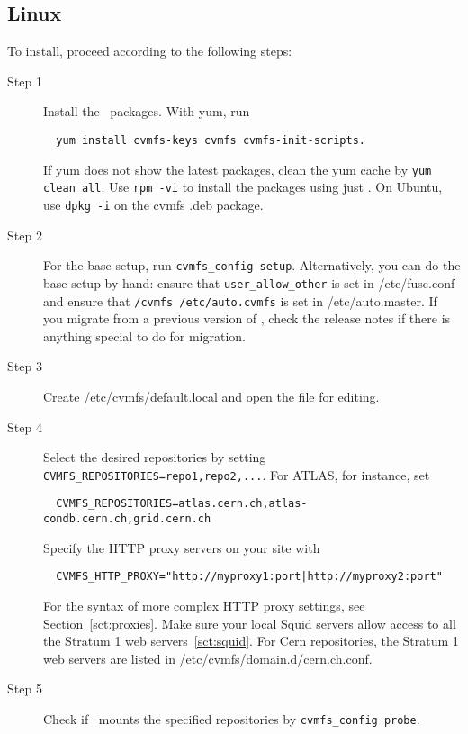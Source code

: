 \subsection{Linux}
To install, proceed according to the following steps:
\begin{description}
	\item[Step 1] Install the \cvmfs\ packages.  With yum, run
\begin{verbatim}
  yum install cvmfs-keys cvmfs cvmfs-init-scripts.
\end{verbatim}
			      If yum does not show the latest packages, clean the yum cache by \texttt{yum clean all}.
			      Use \texttt{rpm -vi} to install the packages using just \rpm.
			      On Ubuntu, use \texttt{dpkg -i} on the cvmfs .deb package.
    \item[Step 2] For the base setup, run \texttt{cvmfs\_config setup}.
    				Alternatively, you can do the base setup by hand: ensure that \texttt{user\_allow\_other} is set in /etc/fuse.conf and ensure that \texttt{/cvmfs /etc/auto.cvmfs} is set in /etc/auto.master.
					If you migrate from a previous version of \cvmfs, check the release notes if there is anything special to do for migration.
	\item[Step 3] Create /etc/cvmfs/default.local and open the file for editing.
	\item[Step 4] Select the desired repositories by setting \texttt{CVMFS\_REPOSITORIES=repo1,repo2,...}.
		For ATLAS, for instance, set 
\begin{verbatim}
  CVMFS_REPOSITORIES=atlas.cern.ch,atlas-condb.cern.ch,grid.cern.ch
\end{verbatim}
		Specify the HTTP proxy servers on your site with
\begin{verbatim}
  CVMFS_HTTP_PROXY="http://myproxy1:port|http://myproxy2:port"
\end{verbatim}
		For the syntax of more complex HTTP proxy settings, see Section~\ref{sct:proxies}.
		Make sure your local Squid servers allow access to all the Stratum 1 web servers~\ref{sct:squid}.
		For Cern repositories, the Stratum 1 web servers are listed in /etc/cvmfs/domain.d/cern.ch.conf.
	\item[Step 5] Check if \cvmfs\ mounts the specified repositories by \texttt{cvmfs\_config probe}.
\end{description}


